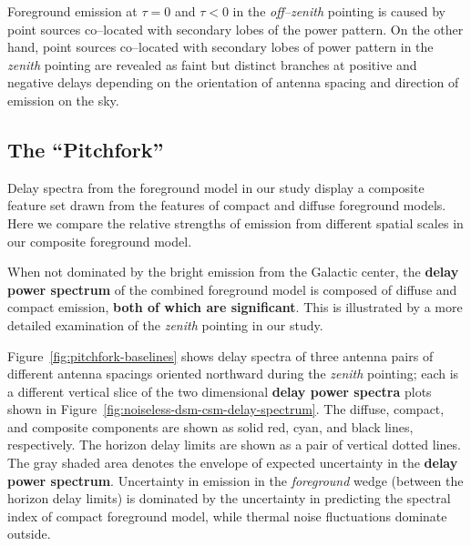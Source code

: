 \documentclass[preprint2,iop,numberedappendix,twocolappendix,appendixfloats]{emulateapj}
\begin{document}
Foreground emission at $\tau=0$ and $\tau<0$ in the {\it off--zenith} pointing is caused by point sources co--located with secondary lobes of the power pattern. On the other hand, point sources co--located with secondary lobes of power pattern in the {\it zenith} pointing are revealed as faint but distinct branches at positive and negative delays depending on the orientation of antenna spacing and direction of emission on the sky. 

\subsection{The ``Pitchfork''}\label{sec:composite}

Delay spectra from the foreground model in our study display a composite feature set drawn from the features of compact and diffuse foreground models. Here we compare the relative strengths of emission from different spatial scales in our composite foreground model. 

When not dominated by the bright emission from the Galactic center, the {\bf delay power spectrum} of the combined foreground model is composed of diffuse and compact emission, {\bf both of which are significant}. This is illustrated by a more detailed examination of the {\it zenith} pointing in our study. 

Figure~\ref{fig:pitchfork-baselines} shows delay spectra of three antenna pairs of different antenna spacings oriented northward during the {\it zenith} pointing; each is a different vertical slice of the two dimensional {\bf delay power spectra} plots shown in Figure~\ref{fig:noiseless-dsm-csm-delay-spectrum}. The diffuse, compact, and composite components are shown as solid red, cyan, and black lines, respectively. The horizon delay limits are shown as a pair of vertical dotted lines. The gray shaded area denotes the envelope of expected uncertainty in the {\bf delay power spectrum}. Uncertainty in emission in the {\it foreground} wedge (between the horizon delay limits) is dominated by the %
uncertainty in predicting the spectral index of compact foreground model, while thermal noise fluctuations dominate outside. 
\end{document}
